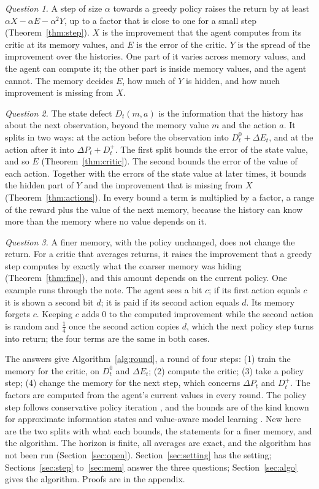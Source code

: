 \documentclass{article}
\newcounter{algo}
\theoremstyle{definition}
\newcommand{\dE}{\Delta E}
\newcommand{\dP}{\Delta P}
\begin{document}
\emph{Question 1.} A step of size $\alpha$ towards a greedy policy raises the return by at least $\alpha X-\alpha E-\alpha^2Y$, up to a factor that is close to one for a small step (Theorem~\ref{thm:step}). $X$ is the improvement that the agent computes from its critic at its memory values, and $E$ is the error of the critic. $Y$ is the spread of the improvement over the histories. One part of it varies across memory values, and the agent can compute it; the other part is inside memory values, and the agent cannot. The memory decides $E$, how much of $Y$ is hidden, and how much improvement is missing from $X$.

\emph{Question 2.} The state defect $D_t(m,a)$ is the information that the history has about the next observation, beyond the memory value $m$ and the action $a$. It splits in two ways: at the action before the observation into $D^0_t+\dE_t$, and at the action after it into $\dP_t+D^+_t$. The first split bounds the error of the state value, and so $E$ (Theorem~\ref{thm:critic}). The second bounds the error of the value of each action. Together with the errors of the state value at later times, it bounds the hidden part of $Y$ and the improvement that is missing from $X$ (Theorem~\ref{thm:actions}). In every bound a term is multiplied by a factor, a range of the reward plus the value of the next memory, because the history can know more than the memory where no value depends on it.

\emph{Question 3.} A finer memory, with the policy unchanged, does not change the return. For a critic that averages returns, it raises the improvement that a greedy step computes by exactly what the coarser memory was hiding (Theorem~\ref{thm:fine}), and this amount depends on the current policy. One example runs through the note. The agent sees a bit $c$; if its first action equals $c$ it is shown a second bit $d$; it is paid if its second action equals $d$. Its memory forgets $c$. Keeping $c$ adds $0$ to the computed improvement while the second action is random and $\tfrac14$ once the second action copies $d$, which the next policy step turns into return; the four terms are the same in both cases.

The answers give Algorithm~\ref{alg:round}, a round of four steps: (1) train the memory for the critic, on $D^0_t$ and $\dE_t$; (2) compute the critic; (3) take a policy step; (4) change the memory for the next step, which concerns $\dP_t$ and $D^+_t$. The factors are computed from the agent's current values in every round. The policy step follows conservative policy iteration \citep{kakade2002cpi}, and the bounds are of the kind known for approximate information states \citep{subramanian2022approximate} and value-aware model learning \citep{farahmand2017vaml}. New here are the two splits with what each bounds, the statements for a finer memory, and the algorithm. The horizon is finite, all averages are exact, and the algorithm has not been run (Section~\ref{sec:open}). Section~\ref{sec:setting} has the setting; Sections~\ref{sec:step} to~\ref{sec:mem} answer the three questions; Section~\ref{sec:algo} gives the algorithm. Proofs are in the appendix.
\end{document}

